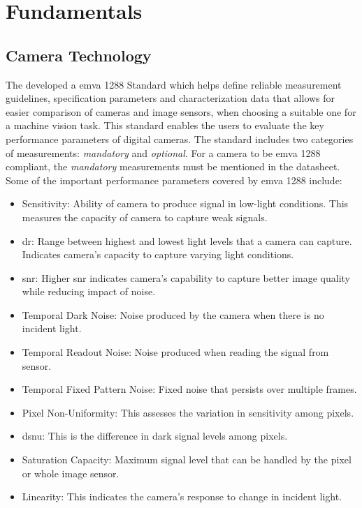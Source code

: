 \chapter{Fundamentals}\label{chap:fundamentals}

    \section{Camera Technology}

    The  developed a \gls{emva} 1288 Standard which helps define reliable measurement guidelines, specification parameters and characterization data that allows for easier comparison of cameras and image sensors, when choosing a suitable one for a machine vision task. This standard enables the users to evaluate the key performance parameters of digital cameras. The standard includes two categories of measurements: \emph{mandatory} and \emph{optional}. For a camera to be \gls{emva} 1288 compliant, the \emph{mandatory} measurements must be mentioned in the datasheet. Some of the important performance parameters covered by \gls{emva} 1288 include:
    \begin{itemize}
        \item Sensitivity: Ability of camera to produce signal in low-light conditions. This measures the capacity of camera to capture weak signals.
        \item \gls{dr}: Range between highest and lowest light levels that a camera can capture. Indicates camera's capacity to capture varying light conditions.
        \item \gls{snr}: Higher \gls{snr} indicates camera's capability to capture better image quality while reducing impact of noise.
        \item Temporal Dark Noise: Noise produced by the camera when there is no incident light.
        \item Temporal Readout Noise: Noise produced when reading the signal from sensor.
        \item Temporal Fixed Pattern Noise: Fixed noise that persists over multiple frames. 
        \item Pixel Non-Uniformity: This assesses the variation in sensitivity among pixels.
        \item \gls{dsnu}: This is the difference in dark signal levels among pixels.
        \item Saturation Capacity: Maximum signal level that can be handled by the pixel or whole image sensor.
        \item Linearity: This indicates the camera's response to change in incident light.
    \end{itemize}   

